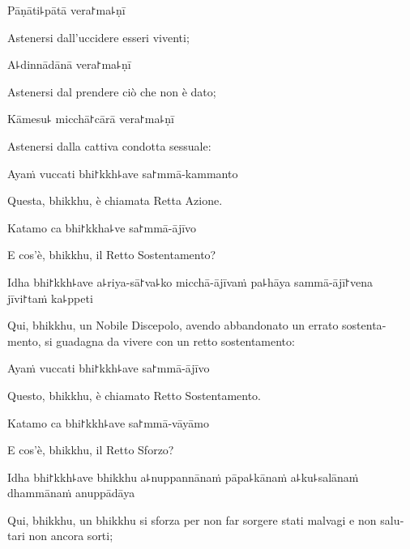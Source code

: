 Pāṇāti꜕pātā vera꜓ma꜕ṇī

\begin{english}
  Astenersi dall'uccidere esseri viventi;
\end{english}

A꜕dinnādānā vera꜓ma꜕ṇī

\begin{english}
  Astenersi dal prendere ciò che non è dato;
\end{english}

Kāmesu꜕ micchā꜓cārā vera꜓ma꜕ṇī

\begin{english}
  Astenersi dalla cattiva condotta sessuale:
\end{english}

Ayaṁ vuccati bhi꜓kkh꜕ave sa꜓mmā-kammanto

\begin{english}
  Questa, bhikkhu, è chiamata Retta Azione.
\end{english}

Katamo ca bhi꜓kkha꜕ve sa꜓mmā-ājīvo

\begin{english}
  E cos'è, bhikkhu, il Retto Sostentamento?
\end{english}

Idha bhi꜓kkh꜕ave a꜕riya-sā꜓va꜕ko micchā-ājīvaṁ pa꜕hāya sammā-ājī꜓vena jīvi꜓taṁ ka꜕ppeti

\begin{english}
  Qui, bhikkhu, un Nobile Discepolo, avendo abbandonato un errato sostentamento, si guadagna da vivere con un retto sostentamento:
\end{english}

Ayaṁ vuccati bhi꜓kkh꜕ave sa꜓mmā-ājīvo

\begin{english}
  Questo, bhikkhu, è chiamato Retto Sostentamento.
\end{english}

Katamo ca bhi꜓kkh꜕ave sa꜓mmā-vāyāmo

\begin{english}
  E cos'è, bhikkhu, il Retto Sforzo?
\end{english}

Idha bhi꜓kkh꜕ave bhikkhu a꜕nuppannānaṁ pāpa꜕kānaṁ a꜕ku꜕salānaṁ dhammānaṁ anuppādāya

\begin{english}
  Qui, bhikkhu, un bhikkhu si sforza per non far sorgere stati malvagi e non salutari non ancora sorti;
\end{english}


